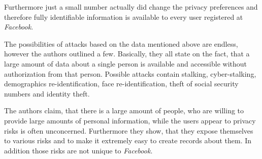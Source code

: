 Furthermore just a small number actually did change the privacy preferences and
therefore fully identifiable information is available to every user registered
at \textit{Facebook}.

The possibilities of attacks based on the data mentioned above are endless,
however the authors outlined a few. Basically, they all state on the fact, that
a large amount of data about a single person is available and accessible
without authorization from that person. Possible attacks contain stalking,
cyber-stalking, demographics re-identification, face re-identification, theft of
social security numbers and identity theft.

The authors claim, that there is a large amount of people, who are willing to
provide large amounts of personal information, while the users appear to
privacy risks is often unconcerned. Furthermore they show, that they expose
themselves to various risks and to make it extremely easy to create records
about them. In addition those risks are not unique to \textit{Facebook}.
